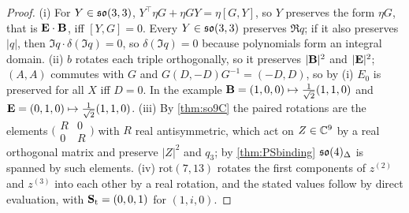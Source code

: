 \begin{proof}
(i) For $Y\in\mathfrak{so}(3,3)$, $Y^{\!\top}\eta G+\eta GY=\eta[G,Y]$, so $Y$ preserves the form $\eta G$, that is $\mathbf E\cdot\mathbf B$, iff $[Y,G]=0$. Every $Y\in\mathfrak{so}(3,3)$
preserves $\Re q$; if it also preserves $|q|$, then $\Im q\cdot\delta(\Im q)=0$, so $\delta(\Im q)=0$ because polynomials form an integral domain. (ii)
$b$ rotates each triple orthogonally, so it preserves $|\mathbf B|^2$ and $|\mathbf E|^2$; $(A,A)$ commutes with $G$ and $G(D,-D)G^{-1}=(-D,D)$, so by (i) $E_0$ is
preserved for all $X$ iff $D=0$. In the example $\mathbf B=(1,0,0)\mapsto\tfrac1{\sqrt2}(1,1,0)$ and $\mathbf E=(0,1,0)\mapsto\tfrac1{\sqrt2}(1,1,0)$. (iii) By
\cref{thm:so9C} the paired rotations are the elements $\bigl(\begin{smallmatrix}R&0\\0&R\end{smallmatrix}\bigr)$ with $R$ real antisymmetric, which act on
$Z\in\mathbb{C}^9$ by a real orthogonal matrix and preserve $|Z|^2$ and $q_3$; by \cref{thm:PSbinding} $\mathfrak{so}(4)_\Delta$ is spanned by such elements. (iv)
$\mathrm{rot}(7,13)$ rotates the first components of $z^{(2)}$ and $z^{(3)}$ into each other by a real rotation, and the stated values follow by
direct evaluation, with $\mathbf S_{\rm t}=(0,0,1)$ for $(1,i,0)$.
\end{proof}

